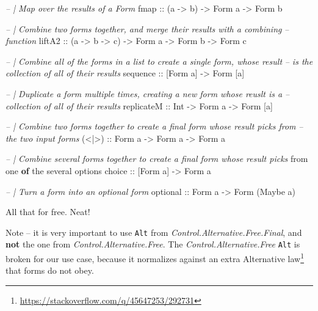 \documentclass[]{article}
\newenvironment{Shaded}{}{}
\newcommand{\CommentTok}[1]{\textcolor[rgb]{0.38,0.63,0.69}{\textit{#1}}}
\newcommand{\DataTypeTok}[1]{\textcolor[rgb]{0.56,0.13,0.00}{#1}}
\newcommand{\KeywordTok}[1]{\textcolor[rgb]{0.00,0.44,0.13}{\textbf{#1}}}
\newcommand{\NormalTok}[1]{#1}
\newcommand{\OtherTok}[1]{\textcolor[rgb]{0.00,0.44,0.13}{#1}}
\renewcommand{\href}[2]{#2\footnote{\url{#1}}}
\begin{document}
\begin{Shaded}
\begin{Highlighting}[]
\CommentTok{-- | Map over the results of a Form}
\NormalTok{fmap}\OtherTok{   ::}\NormalTok{ (a }\OtherTok{->}\NormalTok{ b) }\OtherTok{->} \DataTypeTok{Form}\NormalTok{ a }\OtherTok{->} \DataTypeTok{Form}\NormalTok{ b}

\CommentTok{-- | Combine two forms together, and merge their results with a combining}
\CommentTok{-- function}
\OtherTok{liftA2 ::}\NormalTok{ (a }\OtherTok{->}\NormalTok{ b }\OtherTok{->}\NormalTok{ c) }\OtherTok{->} \DataTypeTok{Form}\NormalTok{ a }\OtherTok{->} \DataTypeTok{Form}\NormalTok{ b }\OtherTok{->} \DataTypeTok{Form}\NormalTok{ c}

\CommentTok{-- | Combine all of the forms in a list to create a single form, whose result}
\CommentTok{-- is the collection of all of their results}
\NormalTok{sequence}\OtherTok{ ::}\NormalTok{ [}\DataTypeTok{Form}\NormalTok{ a] }\OtherTok{->} \DataTypeTok{Form}\NormalTok{ [a]}

\CommentTok{-- | Duplicate a form multiple times, creating a new form whose reuslt is a}
\CommentTok{-- collection of all of their results}
\OtherTok{replicateM ::} \DataTypeTok{Int} \OtherTok{->} \DataTypeTok{Form}\NormalTok{ a }\OtherTok{->} \DataTypeTok{Form}\NormalTok{ [a]}

\CommentTok{-- | Combine two forms together to create a final form whose result picks from}
\CommentTok{-- the two input forms}
\OtherTok{(<|>) ::} \DataTypeTok{Form}\NormalTok{ a }\OtherTok{->} \DataTypeTok{Form}\NormalTok{ a }\OtherTok{->} \DataTypeTok{Form}\NormalTok{ a}

\CommentTok{-- | Combine several forms together to create a final form whose result picks}
\NormalTok{from one }\KeywordTok{of}\NormalTok{ the several options}
\OtherTok{choice ::}\NormalTok{ [}\DataTypeTok{Form}\NormalTok{ a] }\OtherTok{->} \DataTypeTok{Form}\NormalTok{ a}

\CommentTok{-- | Turn a form into an optional form}
\OtherTok{optional ::} \DataTypeTok{Form}\NormalTok{ a }\OtherTok{->} \DataTypeTok{Form}\NormalTok{ (}\DataTypeTok{Maybe}\NormalTok{ a)}
\end{Highlighting}
\end{Shaded}

All that for free. Neat!

Note -- it is very important to use \texttt{Alt} from
\emph{Control.Alternative.Free.Final}, and \textbf{not} the one from
\emph{Control.Alternative.Free}. The \emph{Control.Alternative.Free}
\texttt{Alt} is broken for our use case, because it normalizes against
\href{https://stackoverflow.com/q/45647253/292731}{an extra Alternative law}
that forms do not obey.
\end{document}
